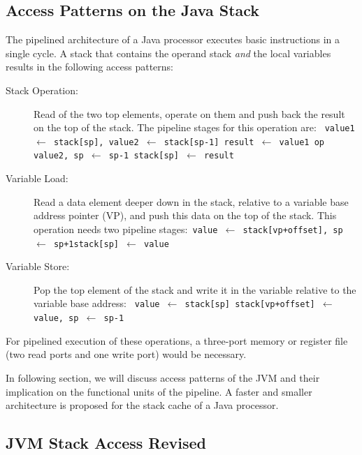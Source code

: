 \subsection{Access Patterns on the Java Stack}
\label{subsec:access}

The pipelined architecture of a Java processor executes basic
instructions in a single cycle. A stack that contains the operand
stack \emph{and} the local variables results in the following access
patterns:
%
\begin{description}
\item[Stack Operation:] Read of the two top elements, operate on them and
push back the result on the top of the stack. The pipeline stages
for this operation are:\newline
\texttt{
    value1 $\leftarrow $ stack[sp], value2 $\leftarrow $ stack[sp-1]\newline
    result $\leftarrow $ value1 op value2, sp $\leftarrow $ sp-1\newline
    stack[sp] $\leftarrow $ result
}

\item[Variable Load:] Read a data element deeper down in the
    stack, relative to a variable base address pointer (VP), and
    push this data on the top of the stack. This operation needs
    two pipeline stages:\newline \texttt{ value $\leftarrow $
    stack[vp+offset], sp $\leftarrow $ sp+1\newline stack[sp]
    $\leftarrow $ value
}

\item[Variable Store:] Pop the top element of the stack and write it in
the variable relative to the variable base address:\newline
\texttt{
    value $\leftarrow $ stack[sp]\newline
    stack[vp+offset] $\leftarrow $ value, sp $\leftarrow $ sp-1
}
\end{description}
%
For pipelined execution of these operations, a three-port memory or
register file (two read ports and one write port) would be necessary.


In following section, we will discuss access patterns of the JVM and
their implication on the functional units of the pipeline. A faster
and smaller architecture is proposed for the stack cache of a Java
processor.

\subsection{JVM Stack Access Revised}

